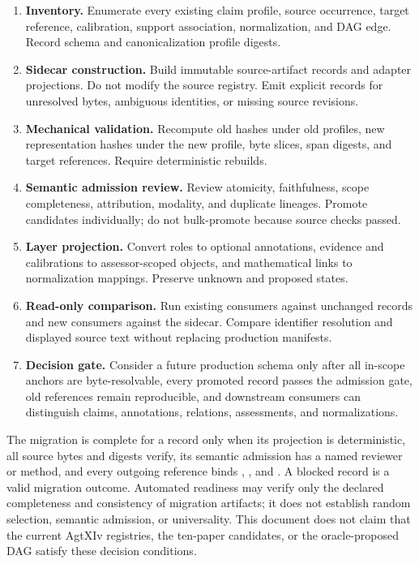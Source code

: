 \begin{enumerate}
  \item \textbf{Inventory.} Enumerate every existing claim profile, source occurrence, target reference, calibration, support association, normalization, and DAG edge. Record schema and canonicalization profile digests.
  \item \textbf{Sidecar construction.} Build immutable source-artifact records and adapter projections. Do not modify the source registry. Emit explicit  records for unresolved bytes, ambiguous identities, or missing source revisions.
  \item \textbf{Mechanical validation.} Recompute old hashes under old profiles, new representation hashes under the new profile, byte slices, span digests, and target references. Require deterministic rebuilds.
  \item \textbf{Semantic admission review.} Review atomicity, faithfulness, scope completeness, attribution, modality, and duplicate lineages. Promote candidates individually; do not bulk-promote because source checks passed.
  \item \textbf{Layer projection.} Convert roles to optional annotations, evidence and calibrations to assessor-scoped objects, and mathematical links to normalization mappings. Preserve unknown and proposed states.
  \item \textbf{Read-only comparison.} Run existing consumers against unchanged records and new consumers against the sidecar. Compare identifier resolution and displayed source text without replacing production manifests.
  \item \textbf{Decision gate.} Consider a future production schema only after all in-scope anchors are byte-resolvable, every promoted record passes the admission gate, old references remain reproducible, and downstream consumers can distinguish claims, annotations, relations, assessments, and normalizations.
\end{enumerate}

The migration is complete for a record only when its projection is deterministic, all source bytes and digests verify, its semantic admission has a named reviewer or method, and every outgoing reference binds , , and . A blocked record is a valid migration outcome. Automated readiness may verify only the declared completeness and consistency of migration artifacts; it does not establish random selection, semantic admission, or universality. This document does not claim that the current AgtXIv registries, the ten-paper candidates, or the oracle-proposed DAG satisfy these decision conditions.

